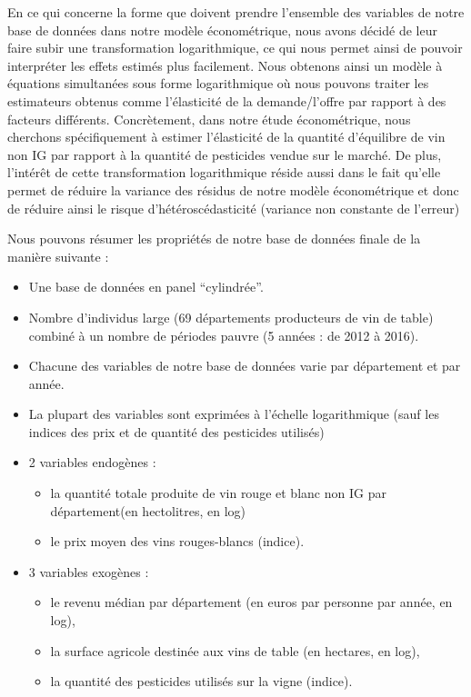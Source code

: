\documentclass[11pt,]{article}
\providecommand{\tightlist}{%
  \setlength{\itemsep}{0pt}\setlength{\parskip}{0pt}}
\begin{document}
En ce qui concerne la forme que doivent prendre l'ensemble des variables
de notre base de données dans notre modèle économétrique, nous avons
décidé de leur faire subir une transformation logarithmique, ce qui nous
permet ainsi de pouvoir interpréter les effets estimés plus facilement.
Nous obtenons ainsi un modèle à équations simultanées sous forme
logarithmique où nous pouvons traiter les estimateurs obtenus comme
l'élasticité de la demande/l'offre par rapport à des facteurs
différents. Concrètement, dans notre étude économétrique, nous cherchons
spécifiquement à estimer l'élasticité de la quantité d'équilibre de vin
non IG par rapport à la quantité de pesticides vendue sur le marché. De
plus, l'intérêt de cette transformation logarithmique réside aussi dans
le fait qu'elle permet de réduire la variance des résidus de notre
modèle économétrique et donc de réduire ainsi le risque
d'hétéroscédasticité (variance non constante de l'erreur)

Nous pouvons résumer les propriétés de notre base de données finale de
la manière suivante :

\begin{itemize}
\item
  Une base de données en panel ``cylindrée''.
\item
  Nombre d'individus large (69 départements producteurs de vin de table)
  combiné à un nombre de périodes pauvre (5 années : de 2012 à 2016).
\item
  Chacune des variables de notre base de données varie par département
  et par année.
\item
  La plupart des variables sont exprimées à l'échelle logarithmique
  (sauf les indices des prix et de quantité des pesticides utilisés)
\item
  2 variables endogènes :

  \begin{itemize}
  \tightlist
  \item
    la quantité totale produite de vin rouge et blanc non IG par
    département(en hectolitres, en log)
  \item
    le prix moyen des vins rouges-blancs (indice).
  \end{itemize}
\item
  3 variables exogènes :

  \begin{itemize}
  \tightlist
  \item
    le revenu médian par département (en euros par personne par année,
    en log),
  \item
    la surface agricole destinée aux vins de table (en hectares, en
    log),
  \item
    la quantité des pesticides utilisés sur la vigne (indice).
  \end{itemize}
\end{itemize}
\end{document}
